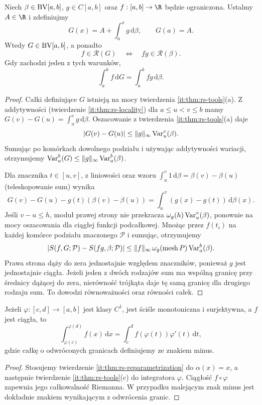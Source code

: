 \begin{twierdzenie}\label{it:thm:rs-integrator-substitution}
Niech $\beta\in\mathrm{BV}[a,b]$, $g\in C[a,b]$ oraz $f:[a,b]\to\R$
będzie ograniczona. Ustalmy $A\in\R$ i zdefiniujmy
\[
 G(x)=A+\int_a^x g\,\mathrm d\beta,\qquad G(a)=A.
\]
Wtedy $G\in\mathrm{BV}[a,b]$, a ponadto
\[
 f\in\mathcal R(G)\quad\Longleftrightarrow\quad
 fg\in\mathcal R(\beta).
\]
Gdy zachodzi jeden z tych warunków,
\[
 \int_a^b f\,\mathrm dG=\int_a^b fg\,\mathrm d\beta.
\]
\end{twierdzenie}
\begin{proof}
Całki definiujące $G$ istnieją na mocy twierdzenia
\ref{it:thm:rs-tools}(a). Z addytywności
(twierdzenie \ref{it:thm:rs-locality}) dla $a\le u<v\le b$ mamy
$G(v)-G(u)=\int_u^v g\,\mathrm d\beta$. Oszacowanie z twierdzenia
\ref{it:thm:rs-tools}(a) daje
\[
 |G(v)-G(u)|\le\|g\|_\infty\operatorname{Var}_u^v(\beta).
\]
Sumując po komórkach dowolnego podziału i używając addytywności
wariacji, otrzymujemy $\operatorname{Var}_a^b(G)\le\|g\|_\infty\operatorname{Var}_a^b(\beta)$.

Dla znacznika $t\in[u,v]$, z liniowości oraz wzoru
$\int_u^v 1\,\mathrm d\beta=\beta(v)-\beta(u)$ (teleskopowanie sum)
wynika
\[
 G(v)-G(u)-g(t)(\beta(v)-\beta(u))
 =\int_u^v(g(x)-g(t))\,\mathrm d\beta(x).
\]
Jeśli $v-u\le h$, moduł prawej strony nie przekracza
$\omega_g(h)\operatorname{Var}_u^v(\beta)$, ponownie na mocy oszacowania
dla ciągłej funkcji podcałkowej. Mnożąc przez $f(t_i)$ na
każdej komórce podziału znaczonego $\mathcal P$ i sumując,
otrzymujemy
\[
 |S(f,G;\mathcal P)-S(fg,\beta;\mathcal P)|
 \le \|f\|_\infty\,\omega_g(\operatorname{mesh} P)\operatorname{Var}_a^b(\beta).
\]
Prawa strona dąży do zera jednostajnie względem znaczników,
ponieważ $g$ jest jednostajnie ciągła. Jeżeli jeden z dwóch
rodzajów sum ma wspólną granicę przy średnicy dążącej do zera,
nierówność trójkąta daje tę samą granicę dla drugiego rodzaju sum.
To dowodzi równoważności oraz równości całek.
\end{proof}

\begin{wniosek}\label{it:cor:rs-classical-substitution}
Jeżeli $\varphi:[c,d]\to[a,b]$ jest klasy $C^1$, jest ściśle
monotoniczna i surjektywna, a $f$ jest ciągła, to
\[
 \int_{\varphi(c)}^{\varphi(d)} f(x)\,\mathrm dx
 =\int_c^d f(\varphi(t))\varphi'(t)\,\mathrm dt,
\]
gdzie całkę o odwróconych granicach definiujemy ze znakiem minus.
\end{wniosek}
\begin{proof}
Stosujemy twierdzenie \ref{it:thm:rs-reparametrization}
do $\alpha(x)=x$, a następnie twierdzenie
\ref{it:thm:rs-tools}(c) do integratora $\varphi$.
Ciągłość $f\circ\varphi$ zapewnia jego całkowalność Riemanna.
W przypadku malejącym znak minus jest dokładnie znakiem
wynikającym z odwrócenia granic.
\end{proof}

